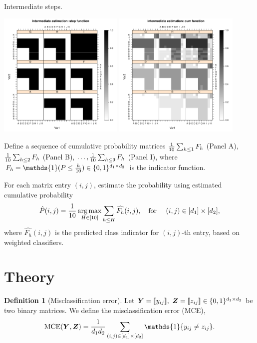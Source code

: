 \documentclass[11pt]{article}
\theoremstyle{plain}
\theoremstyle{definition}
\newtheorem{defn}{Definition}
\begin{document}
Intermediate steps. 


 \begin{center}
\includegraphics[width=6cm]{true_step.pdf}
\hspace{1cm}
\includegraphics[width=6cm]{step_est.pdf}
\end{center}
Define a sequence of cumulative probability matrices ${1\over 10}\sum_{h\leq 1}F_h$ (Panel A), ${1\over 10}\sum_{h\leq 2}F_h$ (Panel B), $\ldots, {1\over 10}\sum_{h\leq 9}F_h$ (Panel I), where $F_h = \mathds{1}(P\leq {h\over 10}) \in \{0,1\}^{d_1\times d_2}$ is the indicator function. 


For each matrix entry $(i,j)$, estimate the probability using estimated cumulative probability
\[
\hat P(i,j) = {1\over 10}\operatorname*{arg\,max}_{H\in[10]} \sum_{h\leq H} \widehat{F_h}(i,j),\quad \text{for }\quad (i,j)\in[d_1]\times[d_2],
\]
where $\widehat{F_h}(i,j)$ is the predicted class indicator for $(i,j)$-th entry, based on weighted classifiers.  

\section{Theory}
\begin{defn}[Misclassification error]
Let $\mY=\entry{y_{ij}},\ \mZ=\entry{z_{ij}}\in\{0,1\}^{d_1\times d_2}$ be two binary matrices. We define the misclassification error (MCE),
\[
\textup{MCE}(\mY,\mZ)={1\over d_1d_2}\sum_{(i,j)\in[d_1]\times[d_2]} \mathds{1}\{y_{ij}\neq z_{ij}\}.
\]
\end{defn}
\end{document}
